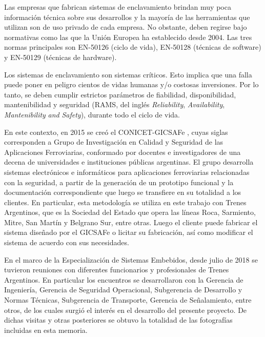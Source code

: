 		Las empresas que fabrican sistemas de enclavamiento \cite{cite5,cite6,cite7,cite8,cite9,cite10,cite12,cite13,cite14,cite15} brindan muy poca información técnica sobre sus desarrollos y la mayoría de las herramientas que utilizan son de uso privado de cada empresa. No obstante, deben regirse bajo normativas como las que la Unión Europea ha establecido desde 2004. Las tres normas principales son EN-50126\cite{EN50126} (ciclo de vida), EN-50128\cite{EN50128} (técnicas de software) y EN-50129\cite{EN50129} (técnicas de hardware). %
		
		Los sistemas de enclavamiento son sistemas críticos. Esto implica que una falla puede poner en peligro cientos de vidas humanas y/o costosas inversiones. Por lo tanto, se deben cumplir estrictos parámetros de fiabilidad, disponibilidad, mantenibilidad y seguridad (RAMS, del inglés \textit{Reliability}, \textit{Availability}, \textit{Mantenibility} \textit{and} \textit{Safety}), durante todo el ciclo de vida.
		
		En este contexto, en 2015 se creó el CONICET-GICSAFe \cite{GICSAFE}, cuyas siglas corresponden a Grupo de Investigación en Calidad y Seguridad de las Aplicaciones Ferroviarias, conformado por docentes e investigadores de una decena de universidades e instituciones públicas argentinas. El grupo desarrolla sistemas electrónicos e informáticos para aplicaciones ferroviarias relacionadas con la seguridad, a partir de la generación de un prototipo funcional y la documentación correspondiente que luego se transfiere en su totalidad a los clientes. En particular, esta metodología se utiliza en este trabajo con Trenes Argentinos\cite{Trenes}, que es la Sociedad del Estado que opera las líneas Roca, Sarmiento, Mitre, San Martín y Belgrano Sur, entre otras. Luego el cliente puede fabricar el sistema diseñado por el GICSAFe o licitar su fabricación, así como modificar el sistema de acuerdo con sus necesidades.   
	
		En el marco de la Especialización de Sistemas Embebidos, desde julio de 2018 se tuvieron reuniones con diferentes funcionarios y profesionales de Trenes Argentinos. En particular los encuentros se desarrollaron con la Gerencia de Ingeniería, Gerencia de Seguridad Operacional, Subgerencia de Desarrollo y Normas Técnicas, Subgerencia de Transporte, Gerencia de Señalamiento, entre otros, de los cuales surgió el interés en el desarrollo del presente proyecto. De dichas visitas y otras posteriores se obtuvo la totalidad de las fotografías incluidas en esta memoria.
			 	
